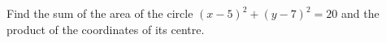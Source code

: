 Find the sum of the area of the circle $(x-5)^2+(y-7)^2=20$ and the product of the coordinates of its centre.

